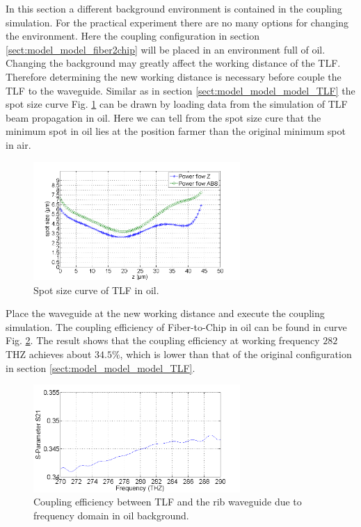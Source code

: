 In this section a different background environment is contained in the coupling simulation. For the practical experiment there are no many options for changing the environment. Here the coupling configuration in section \ref{sect:model_model_fiber2chip} will be placed in an environment full of oil. Changing the background may greatly affect the working distance of the  TLF. Therefore determining the new working distance is necessary before couple the TLF to the waveguide.  Similar as in section \ref{sect:model_model_model_TLF} the spot size curve Fig. \ref{fig:oil_spot_curve} can be drawn by loading data from the simulation of TLF beam propagation in oil. Here we can tell from the spot size cure that the minimum spot in oil lies at the position farmer than the original minimum spot in air.    
\begin{figure}[!ht]
\centering
\includegraphics[width=0.7\textwidth]{bilder/spot_curve_oil}
\caption{Spot size curve of TLF in oil.}
\label{fig:oil_spot_curve}
\end{figure}
Place the waveguide at the new working distance and execute the coupling simulation. The coupling efficiency of Fiber-to-Chip in oil can be found in curve Fig. \ref{fig:oil_coupling_curve}. The result shows that the coupling efficiency at working frequency $282$THZ achieves about $34.5\%$, which is lower than that of the original configuration in section \ref{sect:model_model_model_TLF}.
\begin{figure}[!ht]
\centering
\includegraphics[width=0.7\textwidth]{bilder/s21_oil_curve}
\caption{Coupling efficiency between TLF and the rib waveguide due to frequency domain in oil background.}
\label{fig:oil_coupling_curve}
\end{figure}
